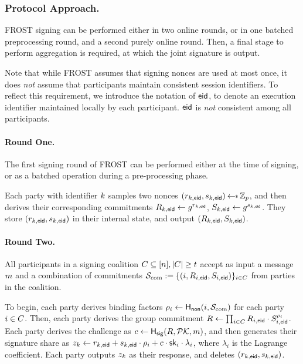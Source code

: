 \subsubsection{Protocol Approach.}

FROST signing can be performed either in two online rounds,
or in one batched preprocessing round,
and a second purely online round.
Then, a final stage to perform aggregation is required,
at which the joint signature is output.

Note that while FROST assumes that signing nonces are used at most once,
it does \emph{not} assume that participants maintain consistent session identifiers.
To reflect this requirement,
we introduce the notation of $\mathsf{eid}$, to denote an execution identifier maintained locally by each participant.
$\mathsf{eid}$ is \emph{not} consistent among all participants.

\paragraph{Round One.}
The first signing round of FROST can be performed either at the time of signing,
or as a batched operation during a pre-processing phase.

Each party with identifier $k$ samples two nonces $(r_{\partyid,\eid},  s_{\partyid, \eid}) \randpick \Zp$,
and then derives their corresponding commitments  $R_{k,\mathsf{eid}} \gets g^{r_{k, \mathsf{eid}}}$, $ S_{k,\mathsf{eid}} \gets  g^{s_{k,\mathsf{eid}}}$.
They store $(r_{k,\mathsf{eid}}, s_{k,\mathsf{eid}})$ in their internal state,
and output $(R_{k,\mathsf{eid}}, S_{k,\mathsf{eid}})$.

\paragraph{Round Two.}
All participants in a signing coalition $C \subseteq [n], \lvert C \rvert \geq t$ accept as input a message $m$ and a combination of commitments $\mathcal{S}_{\rm com} := \{ (i, R_{i,\mathsf{eid}}, S_{i,\mathsf{eid}})\}_{i \in C}$ from parties in the coalition.

To begin,
each party derives binding factors $\rho_i \gets \mathsf{H_{non}}(i, \mathcal{S}_{\rm com})$ for each party $i \in C$.
Then, each party derives the group commitment $R \gets \prod_{i \in C} R_{i,\mathsf{eid}} \cdot  S_{i,\mathsf{eid}}^{\rho_i}$.
Each party derives the challenge as $c \gets \mathsf{H_{sig}}(R, \mathcal{PK}, m)$,
and then generates their signature share as
$z_k \gets r_{k,\mathsf{eid}} + s_{k,\mathsf{eid}} \cdot \rho_i + c \cdot \mathsf{sk}_i \cdot \lambda_i$,
where $\lambda_i$ is the Lagrange coefficient.
Each party outputs $z_k$ as their response,
and deletes $(r_{k,\mathsf{eid}}, s_{k,\mathsf{eid}})$.


